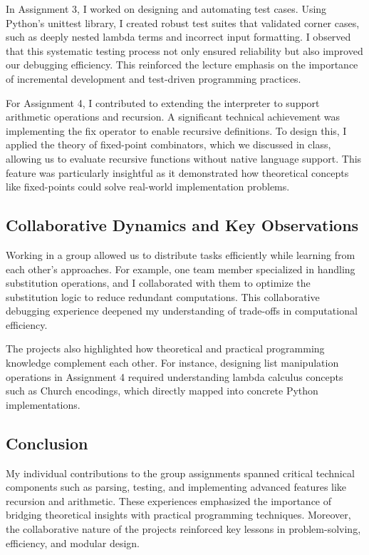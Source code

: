 \documentclass{article}
\theoremstyle{theorem}
\theoremstyle{definition}
\theoremstyle{remark}
\begin{document}
{In Assignment 3, I worked on designing and automating test cases. Using Python's unittest library, I created robust test suites that validated corner cases, such as deeply nested lambda terms and incorrect input formatting. I observed that this systematic testing process not only ensured reliability but also improved our debugging efficiency. This reinforced the lecture emphasis on the importance of incremental development and test-driven programming practices.

For Assignment 4, I contributed to extending the interpreter to support arithmetic operations and recursion. A significant technical achievement was implementing the fix operator to enable recursive definitions. To design this, I applied the theory of fixed-point combinators, which we discussed in class, allowing us to evaluate recursive functions without native language support. This feature was particularly insightful as it demonstrated how theoretical concepts like fixed-points could solve real-world implementation problems.

\subsection{Collaborative Dynamics and Key Observations}

Working in a group allowed us to distribute tasks efficiently while learning from each other’s approaches. For example, one team member specialized in handling substitution operations, and I collaborated with them to optimize the substitution logic to reduce redundant computations. This collaborative debugging experience deepened my understanding of trade-offs in computational efficiency.

The projects also highlighted how theoretical and practical programming knowledge complement each other. For instance, designing list manipulation operations in Assignment 4 required understanding lambda calculus concepts such as Church encodings, which directly mapped into concrete Python implementations.

\subsection{Conclusion}

My individual contributions to the group assignments spanned critical technical components such as parsing, testing, and implementing advanced features like recursion and arithmetic. These experiences emphasized the importance of bridging theoretical insights with practical programming techniques. Moreover, the collaborative nature of the projects reinforced key lessons in problem-solving, efficiency, and modular design.

}
\end{document}

